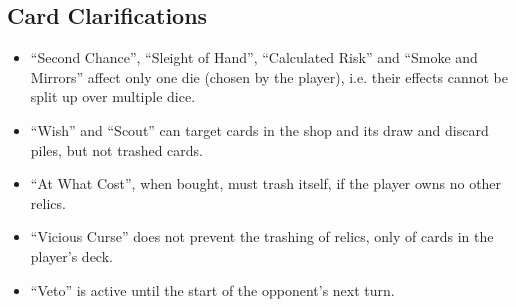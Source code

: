 \documentclass[dvipsnames,parskip,a4paper]{scrartcl}
\begin{document}
\subsection*{Card Clarifications}

\begin{itemize}
\item ``Second Chance'', ``Sleight of Hand'', ``Calculated Risk'' and ``Smoke and Mirrors'' affect only one die (chosen by the player), i.e. their effects cannot be split up over multiple dice.
\item ``Wish'' and ``Scout'' can target cards in the shop and its draw and discard piles, but not trashed cards.
\item ``At What Cost'', when bought, must trash itself, if the player owns no other relics.
\item ``Vicious Curse'' does not prevent the trashing of relics, only of cards in the player's deck.
\item ``Veto'' is active until the start of the opponent's next turn.
\end{itemize}

\newpage
\end{document}
